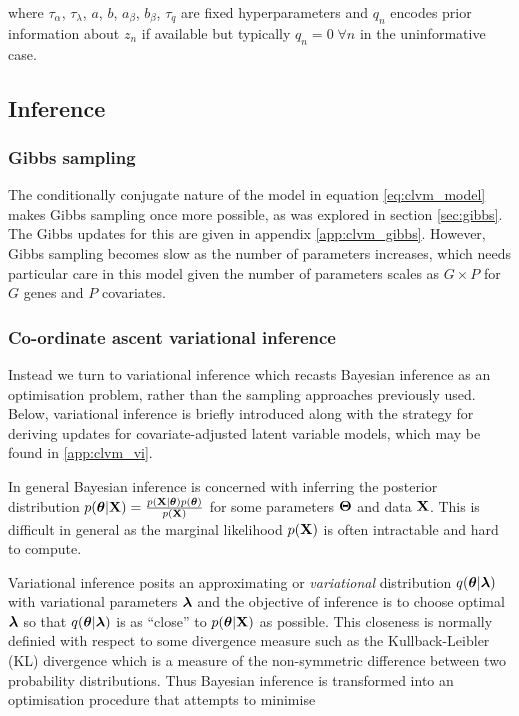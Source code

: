 where $\tau_\alpha$, $\tau_\lambda$, $a$, $b$, $a_\beta$, $b_\beta$, $\tau_q$ are fixed hyperparameters and $q_n$ encodes prior information about $z_n$ if available but typically $q_n = 0 \; \forall n$ in the uninformative case.



\subsection{Inference}

\subsubsection{Gibbs sampling}

The conditionally conjugate nature of the model in equation \ref{eq:clvm_model} makes Gibbs sampling once more possible, as was explored in section \ref{sec:gibbs}. The Gibbs updates for this are given in appendix \ref{app:clvm_gibbs}. However, Gibbs sampling becomes slow as the number of parameters increases, which needs particular care in this model given the number of parameters scales as $G \times P$ for $G$ genes and $P$ covariates.

\subsubsection{Co-ordinate ascent variational inference}

Instead we turn to variational inference which recasts Bayesian inference as an optimisation problem, rather than the sampling approaches previously used. Below, variational inference is briefly introduced along with the strategy for deriving updates for covariate-adjusted latent variable models, which may be found in \ref{app:clvm_vi}.

In general Bayesian inference is concerned with inferring the posterior distribution $p(\bm{\theta} | \mathbf{X}) = \frac{p(\mathbf{X} | \bm{\theta}) p(\bm{\theta})}{p(\mathbf{X})}$ for some parameters $\bm{\Theta}$ and data $\mathbf{X}$. This is difficult in general as the marginal likelihood $p(\mathbf{X})$ is often intractable and hard to compute.

Variational inference posits an approximating or \emph{variational} distribution $q(\bm{\theta} | \bm{\lambda})$ with variational parameters $\bm{\lambda}$ and the objective of inference is to choose optimal $\bm{\lambda}$ so that $q(\bm{\theta} | \bm{\lambda})$ is as ``close'' to $p(\bm{\theta} | \mathbf{X})$ as possible. This closeness is normally definied with respect to some divergence measure such as the Kullback-Leibler (KL) divergence which is a measure of the non-symmetric difference between two probability distributions. Thus Bayesian inference is transformed into an optimisation procedure that attempts to minimise

